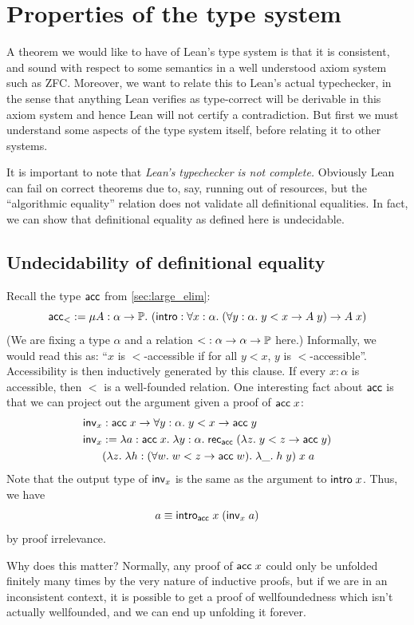 \section{Properties of the type system}\label{sec:props}
A theorem we would like to have of Lean's type system is that it is consistent, and sound with respect to some semantics in a well understood axiom system such as ZFC. Moreover, we want to relate this to Lean's actual typechecker, in the sense that anything Lean verifies as type-correct will be derivable in this axiom system and hence Lean will not certify a contradiction. But first we must understand some aspects of the type system itself, before relating it to other systems.

It is important to note that \emph{Lean's typechecker is not complete.} Obviously Lean can fail on correct theorems due to, say, running out of resources, but the ``algorithmic equality'' relation does not validate all definitional equalities. In fact, we can show that definitional equality as defined here is undecidable.

\subsection{Undecidability of definitional equality}\label{sec:undecidable}
Recall the type $\acc$ from \autoref{sec:large_elim}:
$$\acc_{<}:=\mu A:\alpha\to\P.\ (\intro:\forall x:\alpha.\;(\forall y:\alpha.\;y<x\to A\;y)\to A\;x)$$
(We are fixing a type $\alpha$ and a relation ${<}:\alpha\to\alpha\to\P$ here.) Informally, we would read this as: ``$x$ is $<$-accessible if for all $y<x$, $y$ is $<$-accessible''. Accessibility is then inductively generated by this clause. If every $x:\alpha$ is accessible, then $<$ is a well-founded relation. One interesting fact about $\acc$ is that we can project out the argument given a proof of $\acc\;x$:
\begin{align*}
\inv_x&:\acc\;x\to\forall y:\alpha.\;y<x\to\acc\;y\\
\inv_x&:=\lambda a:\acc\;x.\;\lambda y:\alpha.\;\rec_{\acc}\;(\lambda z.\;y<z\to\acc\;y)\\
&(\lambda z.\;\lambda h:(\forall w.\;w<z\to\acc\;w).\;\lambda \_.\;h\;y)\;x\;a
\end{align*}
Note that the output type of $\inv_x$ is the same as the argument to $\intro\;x$. Thus, we have
$$a\equiv\intro_\acc\;x\;(\inv_x\;a)$$
by proof irrelevance.

Why does this matter? Normally, any proof of $\acc\;x$ could only be unfolded finitely many times by the very nature of inductive proofs, but if we are in an inconsistent context, it is possible to get a proof of wellfoundedness which isn't actually wellfounded, and we can end up unfolding it forever.

